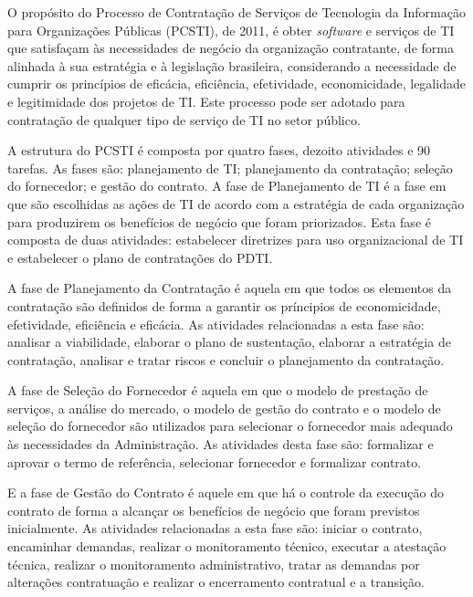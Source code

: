 O propósito do Processo de Contratação de Serviços de Tecnologia da Informação para Organizações Públicas (PCSTI), de 2011, é obter \textit{software} e serviços de TI que satisfaçam às necessidades de negócio da organização contratante, de forma alinhada à sua estratégia e à legislação brasileira, considerando a necessidade de cumprir os princípios de eficácia, eficiência, efetividade, economicidade, legalidade e legitimidade dos projetos de TI. Este processo pode ser adotado para contratação de qualquer tipo de serviço de TI no setor público.

A estrutura do PCSTI é composta por quatro fases, dezoito atividades e 90 tarefas. As fases são: planejamento de TI; planejamento da contratação; seleção do fornecedor; e gestão do contrato.  A fase de Planejamento de TI é a fase em que são escolhidas as ações de TI de acordo com a estratégia de cada organização para produzirem os benefícios de negócio que foram priorizados. Esta fase é composta de duas atividades: estabelecer diretrizes para uso organizacional de TI e estabelecer o plano de contratações do PDTI.

A fase de Planejamento da Contratação é aquela em que todos os elementos da contratação são definidos de forma a garantir os príncipios de economicidade, efetividade, eficiência e eficácia.  As atividades relacionadas a esta fase são: analisar a viabilidade, elaborar o plano de sustentação, elaborar a estratégia de contratação, analisar e tratar riscos e concluir o planejamento da contratação.

A fase de Seleção do Fornecedor é aquela em que o modelo de prestação de serviços, a análise do mercado, o modelo de gestão do contrato e o modelo de seleção do fornecedor são utilizados para selecionar o fornecedor mais adequado às necessidades da Administração. As atividades desta fase são: formalizar e aprovar o termo de referência, selecionar fornecedor e formalizar contrato.

E a fase de Gestão do Contrato é aquele em que há o controle da execução do contrato de forma a alcançar os benefícios de negócio que foram previstos inicialmente.  As atividades relacionadas a esta fase são: iniciar o contrato, encaminhar demandas, realizar o monitoramento técnico, executar a atestação técnica, realizar o monitoramento administrativo, tratar as demandas por alterações contratuação e realizar o encerramento contratual e a transição.



